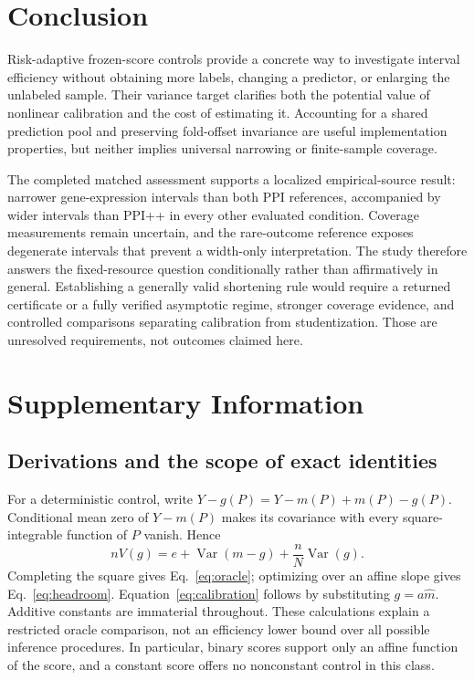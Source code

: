 \documentclass{article}
\newcommand{\Var}{\operatorname{Var}}
\begin{document}
\section{Conclusion}
Risk-adaptive frozen-score controls provide a concrete way to investigate interval efficiency without obtaining more labels, changing a predictor, or enlarging the unlabeled sample. Their variance target clarifies both the potential value of nonlinear calibration and the cost of estimating it. Accounting for a shared prediction pool and preserving fold-offset invariance are useful implementation properties, but neither implies universal narrowing or finite-sample coverage.

The completed matched assessment supports a localized empirical-source result: narrower gene-expression intervals than both PPI references, accompanied by wider intervals than PPI++ in every other evaluated condition. Coverage measurements remain uncertain, and the rare-outcome reference exposes degenerate intervals that prevent a width-only interpretation. The study therefore answers the fixed-resource question conditionally rather than affirmatively in general. Establishing a generally valid shortening rule would require a returned certificate or a fully verified asymptotic regime, stronger coverage evidence, and controlled comparisons separating calibration from studentization. Those are unresolved requirements, not outcomes claimed here.

\clearpage


\clearpage
\appendix
\section{Supplementary Information}
\subsection{Derivations and the scope of exact identities}
For a deterministic control, write $Y-g(P)=Y-m(P)+m(P)-g(P)$. Conditional mean zero of $Y-m(P)$ makes its covariance with every square-integrable function of $P$ vanish. Hence
\[
 nV(g)=e+\Var(m-g)+\frac nN\Var(g).
\]
Completing the square gives Eq.~\eqref{eq:oracle}; optimizing over an affine slope gives Eq.~\eqref{eq:headroom}. Equation~\eqref{eq:calibration} follows by substituting $g=a\widehat m$. Additive constants are immaterial throughout. These calculations explain a restricted oracle comparison, not an efficiency lower bound over all possible inference procedures. In particular, binary scores support only an affine function of the score, and a constant score offers no nonconstant control in this class.
\end{document}
